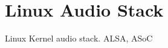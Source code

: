\documentclass[11pt]{article}
\begin{document}
\section{Linux Audio Stack}

Linux Kernel\cite{linux:doc} audio stack. ALSA, ASoC\cite{linux:sound}

\newpage
\printbibliography
\end{document}
